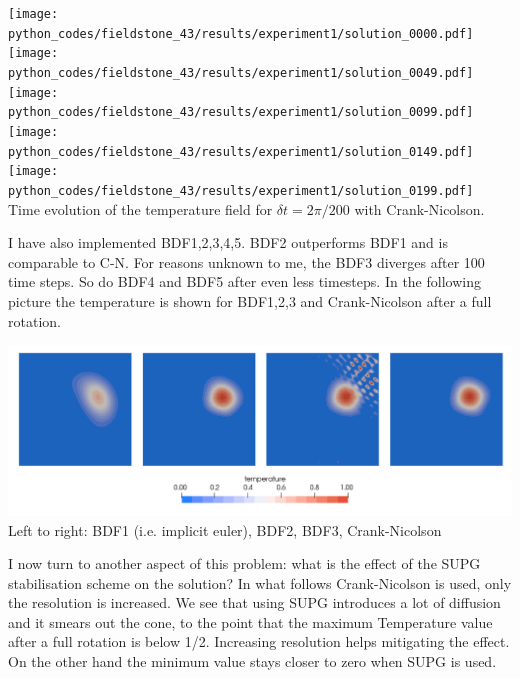 \begin{center}
\texttt{[image: python\_codes/fieldstone\_43/results/experiment1/solution\_0000.pdf]}
\texttt{[image: python\_codes/fieldstone\_43/results/experiment1/solution\_0049.pdf]}
\texttt{[image: python\_codes/fieldstone\_43/results/experiment1/solution\_0099.pdf]}
\texttt{[image: python\_codes/fieldstone\_43/results/experiment1/solution\_0149.pdf]}
\texttt{[image: python\_codes/fieldstone\_43/results/experiment1/solution\_0199.pdf]}\\
{\small Time evolution of the temperature field for $\delta t=2\pi/200$ with Crank-Nicolson.}
\end{center}

I have also implemented BDF1,2,3,4,5. BDF2 outperforms BDF1 and is comparable to C-N. 
For reasons unknown to me, the BDF3 diverges after 100 time steps. So do 
BDF4 and BDF5 after even less timesteps. In the following picture the temperature is shown for 
BDF1,2,3 and Crank-Nicolson after a full rotation.

\begin{center}
\includegraphics[width=15cm]{python_codes/fieldstone_43/results/experiment1/Tbdf123crni.png}\\
{\captionfont Left to right: BDF1 (i.e. implicit euler), BDF2, BDF3, Crank-Nicolson}
\end{center}

I now turn to another aspect of this problem: what is the effect of the SUPG stabilisation 
scheme on the solution? In what follows Crank-Nicolson is used, only the resolution is increased. 
We see that using SUPG introduces a lot of diffusion and it smears out the cone, to the 
point that the maximum Temperature value after a full rotation is below 1/2. Increasing resolution 
helps mitigating the effect.
On the other hand the minimum value stays closer to zero when SUPG is used. 

